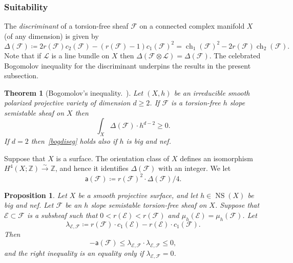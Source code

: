 \documentclass[11pt]{amsart}
\newcommand{\ZZ}{{\mathbb Z}}
\let\mathcal\mathscr
\def\cE{\mathcal{E}}
\def\cF{\mathcal{F}}
\def\cL{\mathcal{L}}
\DeclareMathOperator{\ch}{ch}
\DeclareMathOperator{\NS}{NS}
\newtheorem{thm}[lmm]{Theorem}
\newtheorem{prp}[lmm]{Proposition}
\theoremstyle{definition}
\theoremstyle{remark}
\begin{document}
\subsubsection{Suitability}
%
The \emph{discriminant} of a   torsion-free sheaf $\cF$ on a connected complex manifold $X$ (of any dimension) is given by
%
\begin{equation}\label{eccodisc}
%
 \Delta(\cF)\coloneqq 2r(\cF) c_2(\cF)-(r(\cF)-1) c_1(\cF)^2=\ch_1(\cF)^2-2r(\cF)\ch_2(\cF).
%
\end{equation}
%
Note that if $\cL$ is a line bundle on $X$ then $\Delta(\cF\otimes\cL)=\Delta(\cF)$. The celebrated Bogomolov inequality for the discriminant  underpins the results in the present subsection. 
%
\begin{thm}[Bogomolov's inequality.~\cite{bogomolov:discpos,bogomolov:reststab,huy-lehn:librofasci}]\label{thm:disegbog}
%
Let $(X,h)$ be an irreducible  smooth polarized projective variety of dimension $d\ge 2$. If 
$\cF$ is a torsion-free  $h$ slope semistable sheaf on $X$ then
%
\begin{equation}\label{bogdiseg}
%
\int_X \Delta(\cF)\cdot h^{d-2}\ge 0.
%
\end{equation}
%
If $d=2$ then~\eqref{bogdiseg} holds also if  $h$ is big and nef.
%
\end{thm}
%
Suppose that $X$ is a surface.  The orientation class of $X$ defines an isomorphism $H^4(X;\ZZ)\xrightarrow{\sim} \ZZ$, and hence 
it identifies $\Delta(\cF)$  with an integer.  
 We let
%
\begin{equation}\label{esmeralda}
%
{\mathsf a}(\cF)\coloneqq r(\cF)^2 \cdot \Delta(\cF)/4.
%
\end{equation}  
%
%
\begin{prp}\label{prp:lizzy}
%
Let $X$ be a smooth projective surface, and let  $h\in\NS(X)$ be big and nef. Let $\cF$ be an $h$ slope semistable   torsion-free sheaf  on $X$. Suppose that $\cE\subset\cF$ is a subsheaf such that $0<r(\cE)<r(\cF)$ and $\mu_h(\cE)=\mu_h(\cF)$. Let 
%
\begin{equation}\label{eccolambda}
%
\lambda_{\cE,\cF}\coloneqq r(\cF)\cdot c_1(\cE)-r(\cE)\cdot c_1(\cF).
%
\end{equation}
%
Then 
%
\begin{equation}\label{lizzy}
%
-{\mathsf a}(\cF)\le \lambda_{\cE,\cF}\cdot \lambda_{\cE,\cF}\le 0,
%
\end{equation}
%
and the right inequality is an equality  only if $\lambda_{\cE,\cF}=0$.
%
\end{prp}
%
\end{document}
